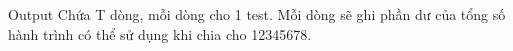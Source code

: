 Output
Chứa T dòng, mỗi dòng cho 1 test. Mỗi dòng sẽ ghi phần dư của tổng số hành trình có thể sử dụng khi chia cho 12345678.